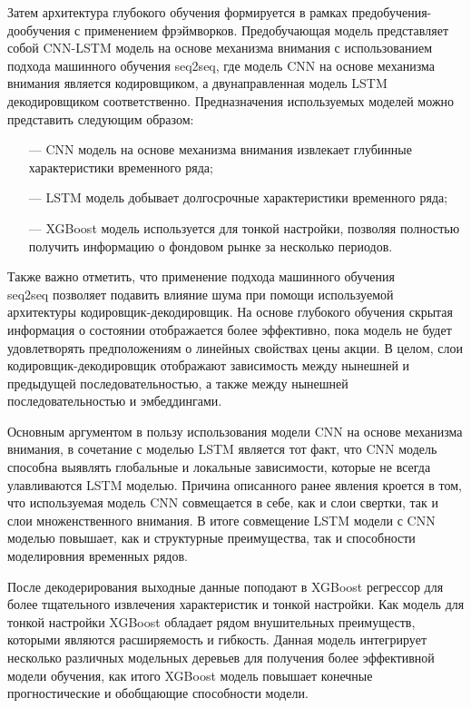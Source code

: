\par Затем архитектура глубокого обучения формируется в рамках предобучения-дообучения с применением фрэймворков.
Предобучающая модель представляет собой CNN-LSTM модель на основе механизма внимания с использованием подхода машинного обучения seq2seq, где модель CNN на основе механизма внимания является кодировщиком, а двунаправленная модель LSTM декодировщиком соответственно. Предназначения используемых моделей можно представить следующим образом:

\begin{itemize}[leftmargin=1.6\parindent]
    \item[---] CNN модель на основе механизма внимания извлекает глубинные характеристики временного ряда;
	\item[---] LSTM модель добывает долгосрочные характеристики временного ряда;
	\item[---] XGBoost модель используется для тонкой настройки, позволяя полностью получить информацию о фондовом рынке за несколько периодов.
\end{itemize}

\par Также важно отметить, что применение подхода машинного обучения \\
seq2seq позволяет подавить влияние шума при помощи используемой архитектуры кодировщик-декодировщик.
На основе глубокого обучения скрытая информация о состоянии отображается более эффективно, пока модель
не будет удовлетворять предположениям о линейных свойствах цены акции. 
В целом, слои кодировщик-декодировщик отображают зависимость между нынешней и предыдущей последовательностью, а также между нынешней последовательностью и эмбеддингами.

\par Основным аргументом в пользу использования модели CNN на основе механизма внимания, в сочетание с моделью LSTM является тот факт, что CNN модель способна выявлять глобальные и локальные зависимости, которые не всегда улавливаются LSTM моделью. Причина описанного ранее явления кроется в том, что используемая модель CNN совмещается в себе, как и слои свертки, так и слои множенственного внимания. В итоге совмещение LSTM модели с CNN моделью повышает, как и структурные преимущества, так и способности моделировния временных рядов. 

\par После декодерирования выходные данные поподают в XGBoost регрессор для более тщательного извлечения характеристик и тонкой настройки. 
Как модель для тонкой настройки XGBoost обладает рядом внушительных преимуществ, которыми являются расширяемость и гибкость. Данная модель интегрирует несколько различных модельных деревьев для получения более эффективной модели обучения, как итого XGBoost модель повышает конечные прогностические и обобщающие способности модели.

